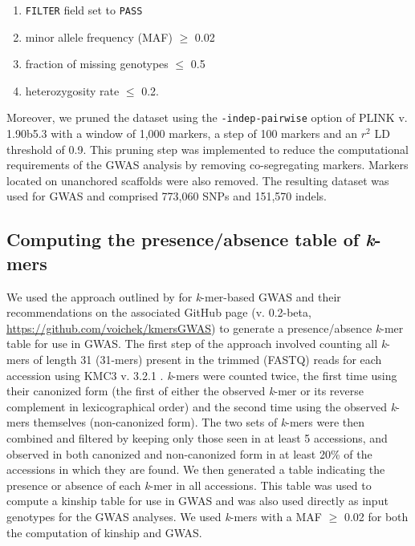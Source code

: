 \begin{enumerate}
	\item \texttt{FILTER} field set to \texttt{PASS}
	\item minor allele frequency (MAF) $\geq$ 0.02
	\item fraction of missing genotypes $\leq$ 0.5
	\item heterozygosity rate $\leq$ 0.2.
\end{enumerate}

Moreover, we pruned the dataset using the \texttt{-\-indep-pairwise} option of
PLINK v. 1.90b5.3 \citep{purcell2007} with a window of 1,000 markers, a
step of 100 markers and an $r^2$ LD threshold of 0.9. This pruning step was
implemented to reduce the computational requirements of the GWAS analysis by
removing co-segregating markers. Markers located on unanchored scaffolds were
also removed. The resulting dataset was used for GWAS and comprised 773,060
SNPs and 151,570 indels.

\subsection*{Computing the presence/absence table of \emph{k}-mers}
\label{sv-gwas-kmer-pav}

We used the approach outlined by \cite{voichek2020} for \emph{k}-mer-based GWAS
and their recommendations on the
associated GitHub page (v. 0.2-beta, \url{https://github.com/voichek/kmersGWAS}) to generate
a presence/absence \emph{k}-mer table for use in GWAS.  The first step of
the approach involved counting all \emph{k}-mers of length 31 (31-mers) present
in the trimmed (FASTQ) reads for each accession using KMC3 v. 3.2.1
\citep{kokot2017}. \emph{k}-mers were counted twice, the first time using their
canonized form (the first of either the observed \textit{k}-mer or its reverse
complement in lexicographical order) and the second time using the observed
\emph{k}-mers themselves (non-canonized form). The two sets of \textit{k}-mers
were then combined and filtered by
keeping only those seen in at least 5 accessions, and observed in both canonized
and non-canonized form in at least 20\% of the accessions in which they are found.
We then generated a table indicating the presence or absence of each
\emph{k}-mer in all accessions. This table was used to compute a kinship
table for use in GWAS and was also used directly as input genotypes for the
GWAS analyses. We used \emph{k}-mers with a MAF $\geq$ 0.02 for both the
computation of kinship and GWAS.

